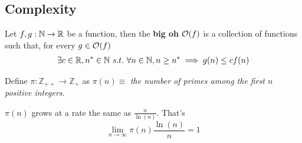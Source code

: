 \documentclass{article}
\def\Z{{\mathbb Z}}
\def\R{{\mathbb R}}
\begin{document}
		\subsection{Complexity}
			\begin{definition}
				Let $f, g: \N \to \R$ be a function, then the \textbf{big oh} $\mathcal{{O}}(f)$ is a collection of functions such that, for every $g \in \mathcal{{O}}(f)$
				\begin{gather}
					\exists c \in \R, n^* \in \N\ s.t.\ \forall n \in \N, n \geq n^* \implies g(n) \leq c f(n)
				\end{gather}
			\end{definition}
			
%			
			
			\begin{definition}
				Define $\pi: \Z_{++} \to \Z_+$ as $\pi(n) \equiv$ \emph{the number of primes among the first $n$ positive integers}.
			\end{definition}
			
			\begin{theorem} $\pi(n)$ grows at a rate the same as $\frac{n}{\ln(n)}$. That's
				\begin{equation}
					\lim_{n \to \infty} \pi(n) \frac{\ln(n)}{n} = 1
				\end{equation}
			\end{theorem}
			
%			
	
\end{document}
